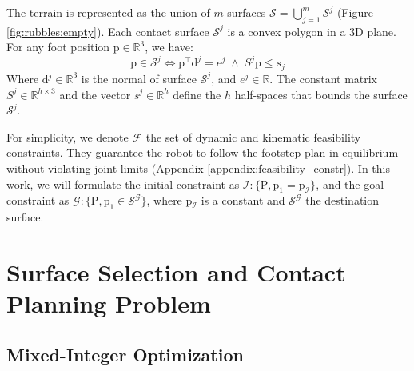 The terrain is represented as the union of $m$ surfaces $\mathcal{S}= \bigcup_{j=1}^m \mathcal{S}^j$ (Figure \ref{fig:rubbles:empty}). 
Each contact surface $\mathcal{S}^j$ is a convex polygon in a 3D plane. 
For any foot position p$ \in \mathbb{R}^{3}$, we have:
\begin{equation}
\label{eq:p_in_S}
    \mbox{p} \in \mathcal{S}^j \iff  \mbox{p}^{\intercal} \mbox{d}^j = e^j \; \land \; S^j \mbox{p} \leq s_j 
\end{equation}
Where d$^j \in \mathbb{R}^3$ is the normal of surface $\mathcal{S}^j$, and $e^j \in \mathbb{R}$. The constant matrix $S^j \in \mathbb{R}^{h \times 3}$ and the vector $s^j \in \mathbb{R}^h$ define the $h$ half-spaces that bounds the surface $\mathcal{S}^j$.

For simplicity, we denote $\mathcal{F}$ the set of dynamic and kinematic feasibility constraints. 
They guarantee the robot to follow the footstep plan in equilibrium without violating joint limits (Appendix \ref{appendix:feasibility_constr}).
In this work, we will formulate the initial constraint as $\mathcal{I} : \{\mbox{P}, \mbox{p}_1 = \mbox{p}_{\mathcal{I}}\}$, and the goal constraint as $\mathcal{G} : \{\mbox{P}, \mbox{p}_1 \in \mathcal{S}^{\mathcal{G}} \}$, where p$_{\mathcal{I}}$ is a constant and $\mathcal{S}^{\mathcal{G}}$ the destination surface.


\section{Surface Selection and Contact Planning Problem}
\label{sub:mip:mip}

\subsection{Mixed-Integer Optimization}


